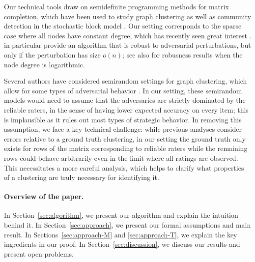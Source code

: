 Our technical tools draw on semidefinite programming methods for matrix 
completion, which have been used to study graph clustering as well 
as community detection in the stochastic block model \citep{holland1983stochastic,condon2001algorithms}. 
Our setting corresponds to the sparse case where all nodes have constant degree, 
which has recently seen great interest \citep{decelle2011asymptotic,
mossel2012stochastic,mossel2013proof,mossel2013belief,
massoulie2014community,guedon2014community,mossel2015consistency,
chin2015stochastic,abbe2015community,makarychev2015learning}. 
\citet{makarychev2015learning} in particular provide an algorithm that is 
robust to adversarial perturbations, but only if the perturbation has 
size $o(n)$; see also \citet{cai2015robust} for robusness results when 
the node degree is logarithmic.

Several authors have considered semirandom settings for graph clustering, which 
allow for some types of adversarial behavior \citep{feige2000finding,
feige2001heuristics,coja2004coloring,krivelevich2006semirandom,
coja2007solving,makarychev2012approximation,chen2014improved,guedon2014community,
moitra2015robust,agarwal2015multisection}. 
In our setting, these semirandom models would need to assume that the adversaries 
are strictly dominated by the reliable raters, in the sense of having lower 
expected accuracy on every item; this is implausible as it rules out 
most types of strategic behavior.
In removing this assumption, we face a key technical challenge: while previous 
analyses consider errors relative to a ground truth clustering, 
in our setting 
the ground truth only exists for rows of the matrix corresponding to reliable 
raters while the remaining rows could behave arbitrarily even in the limit 
where all ratings are observed. This necessitates a more careful analysis, 
which helps to clarify what properties of a clustering are truly necessary 
for identifying it.


\paragraph{Overview of the paper.} In Section~\ref{sec:algorithm}, we 
present our algorithm and explain the intuition behind it.
In Section~\ref{sec:approach}, we present our formal assumptions and main 
result. 
In Sections~\ref{sec:approach-M} and \ref{sec:approach-T}, we explain 
the key ingredients in our proof.
In Section~\ref{sec:discussion}, we discuss our results and 
present open problems.
